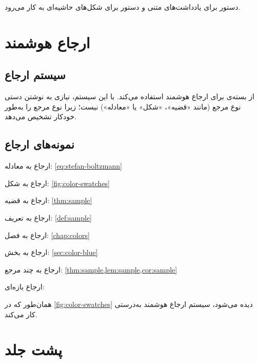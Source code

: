 \documentclass{matinbook}
\begin{document}

دستور  برای یادداشت‌های متنی
و دستور  برای
شکل‌های حاشیه‌ای به کار می‌رود.

\chapter{ارجاع هوشمند}
\label{chap:cref}

\section{سیستم ارجاع}
\label{sec:cref-system}

 از بسته‌ی  برای ارجاع هوشمند
استفاده می‌کند. با این سیستم، نیازی به نوشتن دستی نوع
مرجع (مانند «قضیه»، «شکل» یا «معادله») نیست؛ زیرا
 نوع مرجع را به‌طور خودکار تشخیص می‌دهد.

\section{نمونه‌های ارجاع}
\label{sec:cref-examples}

ارجاع به معادله: \cref{eq:stefan-boltzmann}

ارجاع به شکل: \cref{fig:color-swatches}

ارجاع به قضیه: \cref{thm:sample}

ارجاع به تعریف: \cref{def:sample}

ارجاع به فصل: \cref{chap:colors}

ارجاع به بخش: \cref{sec:color-blue}

ارجاع به چند مرجع: \cref{thm:sample,lem:sample,cor:sample}

ارجاع بازه‌ای: 

همان‌طور که در \cref{fig:color-swatches} دیده می‌شود،
سیستم ارجاع هوشمند  به‌درستی کار می‌کند.

\chapter{پشت جلد}
\label{chap:backcover}
\end{document}
